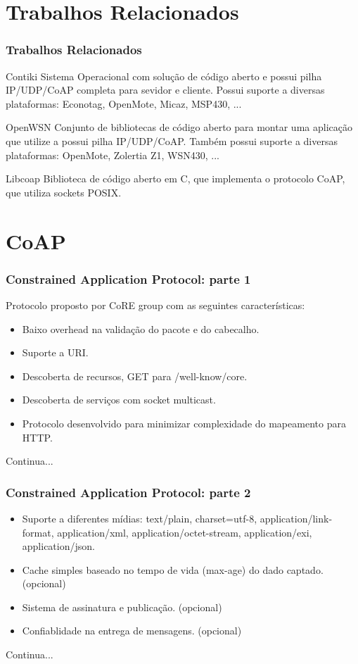 \documentclass{beamer}
\begin{document}

\section{Trabalhos Relacionados}
\begin{frame}
\frametitle{Trabalhos Relacionados}
\begin{block}{Contiki}
Sistema Operacional com solução de código aberto e possui pilha IP/UDP/CoAP completa para sevidor e cliente.
Possui suporte a diversas plataformas: Econotag, OpenMote, Micaz, MSP430, ...
\end{block}

\begin{block}{OpenWSN}
Conjunto de bibliotecas de código aberto para montar uma aplicação que utilize a possui pilha IP/UDP/CoAP.
Também possui suporte a diversas plataformas: OpenMote, Zolertia Z1, WSN430, ...
\end{block}

\begin{block}{Libcoap}
Biblioteca de código aberto em C, que implementa o protocolo CoAP, que utiliza sockets POSIX.
\end{block}
\end{frame}


\section{CoAP}
\begin{frame}
\frametitle{Constrained Application Protocol: parte 1}
Protocolo proposto por CoRE group com as seguintes características:
\begin{itemize}
    \item Baixo overhead na validação do pacote e do cabecalho.
    \item Suporte a URI.
    \item Descoberta de recursos, GET para /well-know/core.
    \item Descoberta de serviços com socket multicast. 
    \item Protocolo desenvolvido para minimizar complexidade do mapeamento para HTTP.
\end{itemize}
Continua...
\end{frame}

\begin{frame}
\frametitle{Constrained Application Protocol: parte 2}
\begin{itemize}
    \item Suporte a diferentes mídias: text/plain, charset=utf-8, application/link-format, application/xml, application/octet-stream, application/exi, application/json.
    \item Cache simples baseado no tempo de vida (max-age) do dado captado. (opcional)
    \item Sistema de assinatura e publicação. (opcional)
    \item Confiablidade na entrega de mensagens. (opcional) 
\end{itemize}
Continua...
\end{frame}
\end{document}
